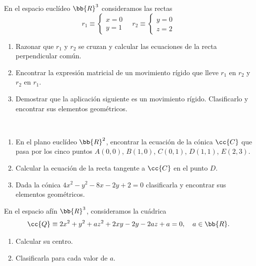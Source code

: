 \documentclass[12pt]{article}
\begin{document}
    \begin{ejercicio}[2,5 puntos]En el espacio euclídeo $\bb{R}^3$ consideramos las rectas
    $$r_1\equiv\begin{cases}x=0\\ y=1\end{cases} \quad r_2\equiv\begin{cases}y=0\\ z=2\end{cases}$$
        \begin{enumerate}[label=(\alph*)]
            \item Razonar que $r_1$ y $r_2$ se cruzan y calcular las ecuaciones de la recta perpendicular común.
            \item Encontrar la expresión matricial de un movimiento rígido que lleve $r_1$ en $r_2$ y $r_2$ en $r_1$.
            \item Demostrar que la aplicación siguiente es un movimiento rígido. Clasificarlo y encontrar sus elementos geométricos.
        \end{enumerate}
    \end{ejercicio}
    

    \begin{ejercicio}[2,5 puntos]~ 
        \begin{enumerate}[label=(\alph*)]
            \item En el plano euclídeo $\bb{R}^2$, encontrar la ecuación de la cónica $\cc{C}$ que pasa por los cinco puntos $A(0,0)$, $B(1,0)$, $C(0,1)$, $D(1,1)$, $E(2,3)$.
            \item Calcular la ecuación de la recta tangente a $\cc{C}$ en el punto $D$.
            \item Dada la cónica $4x^2-y^2-8x-2y+2=0$ clasificarla y encontrar sus elementos geométricos.
        \end{enumerate}
    \end{ejercicio}

    \begin{ejercicio}[2,5 puntos]En el espacio afín $\bb{R}^3$, consideramos la cuádrica
    $$\cc{Q}\equiv2x^2+y^2+az^2+2xy-2y-2az+a=0, \quad a\in\bb{R}.$$
        \begin{enumerate}[label=(\alph*)]
            \item Calcular su centro.
            \item Clasificarla para cada valor de $a$.
        \end{enumerate}
    \end{ejercicio}
\end{document}
